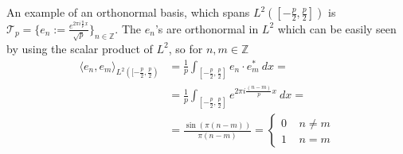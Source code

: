 An example of an orthonormal basis, which spans $L^2([-\frac{p}{2},
\frac{p}{2}])$ is $\mathcal{T}_p = \{e_n := \frac{e^{2\pi i
\frac{n}{p}x}}{\sqrt{p}}\}_{n\in\mathbb{Z}}$. The $e_n$'s are orthonormal in
$L^2$ which can be easily seen by using the scalar product of $L^2$, so for
$n, m \in \mathbb{Z}$
\begin{align}
    \langle e_n, e_m\rangle_{L^2([-\frac{p}{2}, \frac{p}{2})} &=
    \frac{1}{p}\int_{[-\frac{p}{2}, \frac{p}{2}]}e_n \cdot e_m^* \ dx=\\
    &=\frac{1}{p}\int_{[-\frac{p}{2}, \frac{p}{2}]} e^{2\pi i \frac{(n-m)}{p} x} \ dx=\\
    &=\frac{\sin(\pi (n-m))}{\pi(n-m)} =
    \begin{cases}
        0  \;\;\;\; n\neq m\\
        1 \;\;\;\;  n=m
    \end{cases}
\end{align}
